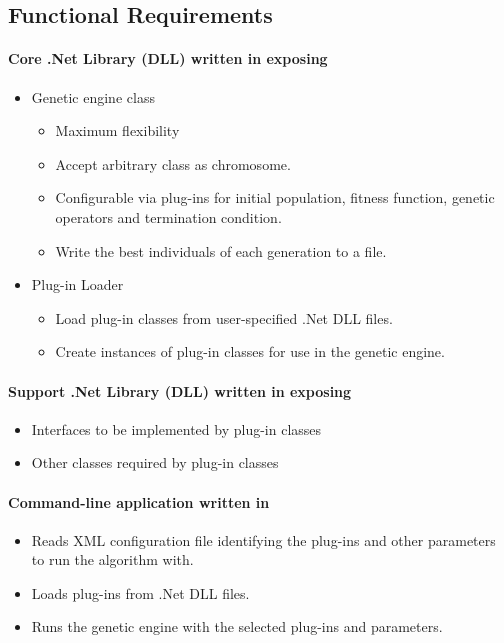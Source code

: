 \subsection{Functional Requirements}
\paragraph*{Core .Net Library (DLL) written in \csharp exposing}
\begin{itemize}
 \item Genetic engine class
 \begin{itemize}
  \item Maximum flexibility
  \item Accept arbitrary class as chromosome.
  \item Configurable via plug-ins for initial population, fitness function, genetic operators and termination condition.
  \item Write the best individuals of each generation to a file.
 \end{itemize}
 \item Plug-in Loader
 \begin{itemize}
  \item Load plug-in classes from user-specified .Net DLL files.
  \item Create instances of plug-in classes for use in the genetic engine.
 \end{itemize}
\end{itemize}

\paragraph*{Support .Net Library (DLL) written in \csharp exposing}
\begin{itemize}
 \item Interfaces to be implemented by plug-in classes
 \item Other classes required by plug-in classes
\end{itemize}

\paragraph*{Command-line application written in \csharp}
\begin{itemize}
 \item Reads XML configuration file identifying the plug-ins and other parameters to run the algorithm with.
 \item Loads plug-ins from .Net DLL files.
 \item Runs the genetic engine with the selected plug-ins and parameters.
\end{itemize}

